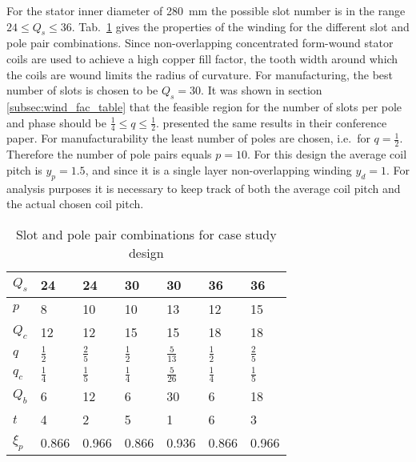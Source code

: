 For the stator inner diameter of \SI{280}{mm} the possible slot number is in the range  $24 \leq Q_s \leq 36$. Tab.~\ref{tab:wnd_char} gives the properties of the winding for the different slot and pole pair combinations. Since non-overlapping concentrated form-wound stator coils are used to achieve a high copper fill factor, the tooth width around which the coils are wound limits the radius of curvature. For manufacturing, the best number of slots is chosen to be $Q_{s}=30$. It was shown in section \ref{subsec:wind_fac_table} that the feasible region for the number of slots per pole and phase should be $\frac{1}{4} \leq q \leq \frac{1}{2}$. \cite{skaar_2006} presented the same results in their conference paper. For manufacturability the least number of poles are chosen, i.e.~for $q=\frac{1}{2}$. Therefore the number of pole pairs equals  $p=10$. For this design the average coil pitch is $y_p = 1.5$, and since it is a single layer non-overlapping winding $y_d=1$. For analysis purposes it is necessary to keep track of both the average coil pitch and the actual chosen coil pitch.
\begin{table}[htbp]
  \centering
  \caption{Slot and pole pair combinations for case study design}
  \begin{tabular}{p{1.2cm}p{1.2cm}p{1.2cm}p{1.2cm}p{1.2cm}p{1.2cm}p{1.2cm}}
  \toprule
  $Q_s  $    &   24  &  24  & 30 & 30 & 36 & 36 \\\midrule
  $p    $    &   8   &  10  & 10 & 13 & 12 & 15 \\\midrule
  $Q_c  $    &   12  &  12  & 15 & 15 & 18 & 18 \\\midrule
  $q    $    &$\frac{1}{2}$&
              $\frac{2}{5}$&
              $\frac{1}{2}$&
              $\frac{5}{13}$&
              $\frac{1}{2}$&
              $\frac{2}{5}$\\\midrule
  $q_{c}$    &$\frac{1}{4}$&
              $\frac{1}{5}$&
              $\frac{1}{4}$&
              $\frac{5}{26}$&
              $\frac{1}{4}$&
              $\frac{1}{5}$\\\midrule
  $Q_b$      &  6   &  12  &  6  & 30 & 6 & 18 \\\midrule
  $t$        &  4   &  2   &  5  & 1  & 6 & 3  \\\midrule
  $\xi_p$    & 0.866 & 0.966 & 0.866 & 0.936 & 0.866 & 0.966 \\\bottomrule
  \end{tabular}
  \label{tab:wnd_char}
\end{table}

